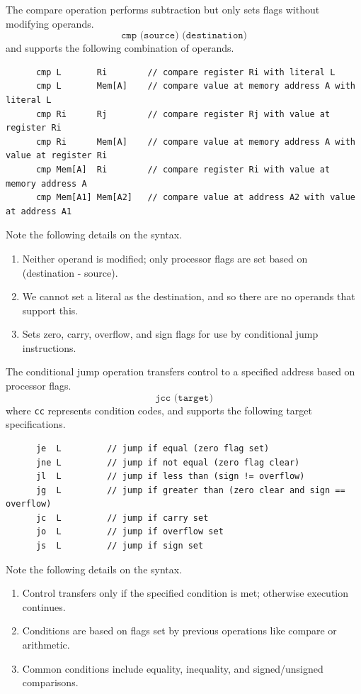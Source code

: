   \begin{definition}[Compare]
    The compare operation performs subtraction but only sets flags without modifying operands.
    \begin{equation}
      \texttt{cmp (source) (destination)}
    \end{equation}
    and supports the following combination of operands.
    \begin{lstlisting}
      cmp L       Ri        // compare register Ri with literal L
      cmp L       Mem[A]    // compare value at memory address A with literal L
      cmp Ri      Rj        // compare register Rj with value at register Ri
      cmp Ri      Mem[A]    // compare value at memory address A with value at register Ri
      cmp Mem[A]  Ri        // compare register Ri with value at memory address A
      cmp Mem[A1] Mem[A2]   // compare value at address A2 with value at address A1
    \end{lstlisting}
    Note the following details on the syntax.
    \begin{enumerate}
      \item Neither operand is modified; only processor flags are set based on (destination - source).
      \item We cannot set a literal as the destination, and so there are no operands that support this.
      \item Sets zero, carry, overflow, and sign flags for use by conditional jump instructions.
    \end{enumerate}
  \end{definition}

  \begin{definition}
    The conditional jump operation transfers control to a specified address based on processor flags.
    \begin{equation}
      \texttt{jcc (target)}
    \end{equation}
    where \texttt{cc} represents condition codes, and supports the following target specifications.
    \begin{lstlisting}
      je  L         // jump if equal (zero flag set)
      jne L         // jump if not equal (zero flag clear)
      jl  L         // jump if less than (sign != overflow)
      jg  L         // jump if greater than (zero clear and sign == overflow)
      jc  L         // jump if carry set
      jo  L         // jump if overflow set
      js  L         // jump if sign set
    \end{lstlisting}
    Note the following details on the syntax.
    \begin{enumerate}
      \item Control transfers only if the specified condition is met; otherwise execution continues.
      \item Conditions are based on flags set by previous operations like compare or arithmetic.
      \item Common conditions include equality, inequality, and signed/unsigned comparisons.
    \end{enumerate}
  \end{definition}

